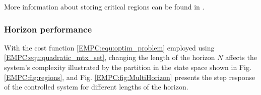     More information about storing critical regions can be found in .

    \subsubsection{Horizon performance}\label{EMPC:sec:Performance}

    With the cost function \ref{EMPC:equ:optim_problem} employed using \ref{EMPC:equ:quadratic_mtx_set}, changing the length of the horizon $N$ affects the system's complexity illustrated by the partition in the state space shown in Fig. \ref{EMPC:fig:regions}, and Fig. \ref{EMPC:fig:MultiHorizon} presents the step response of the controlled system for different lengths of the horizon. 

